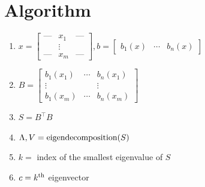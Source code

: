 \documentclass{article}%
\begin{document}
\section{Algorithm}
\begin{enumerate}
    \item $x = \begin{bmatrix}
    \textbf{---} & x_1 & \textbf{---}\\
     & \vdots & \\
     \textbf{---} & x_m & \textbf{---}
\end{bmatrix}, b = \begin{bmatrix}
    b_1(x) & \cdots & b_n(x)
\end{bmatrix}$

\item $B=
\begin{bmatrix}
b_1\left(  x_{1}\right)   & \cdots & b_n\left(  x_1\right)  \\
\vdots &  & \vdots\\
b_1\left(  x_m\right)   & \cdots & b_n\left(  x_m\right)
\end{bmatrix}$

\item $S=B^\intercal B$
\item $\Lambda, V = \textnormal{eigendecomposition}(S)$
\item $k=$ index of the smallest eigenvalue of $S$
\item $c = k^\textnormal{th}$ eigenvector

\end{enumerate}
\end{document}
